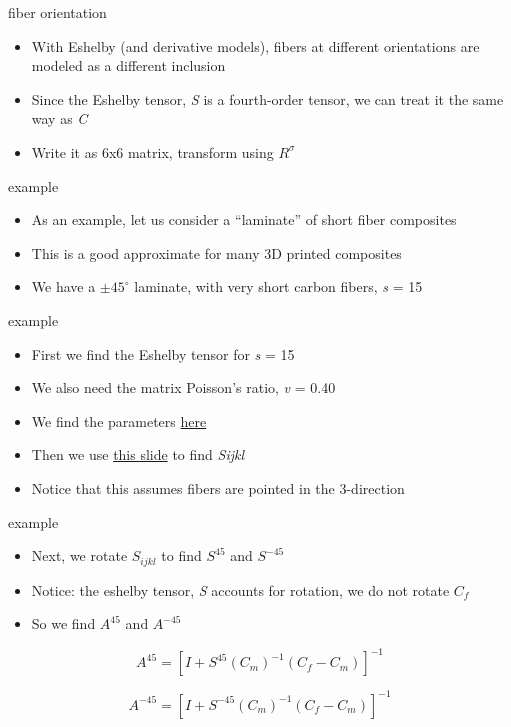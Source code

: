 \documentclass[
  letterpaper,
  ignorenonframetext,
  aspectratio=43,
  handout,
  12pt]{beamer}
\providecommand{\tightlist}{%
  \setlength{\itemsep}{0pt}\setlength{\parskip}{0pt}}
\providecommand{\tightlist}{%
\setlength{\itemsep}{0pt}\setlength{\parskip}{0pt}}
\begin{document}
\begin{frame}{fiber orientation}
\protect\hypertarget{fiber-orientation}{}
\begin{itemize}
\tightlist
\item
  With Eshelby (and derivative models), fibers at different orientations
  are modeled as a different inclusion
\item
  Since the Eshelby tensor, \emph{S} is a fourth-order tensor, we can
  treat it the same way as \emph{C}
\item
  Write it as 6x6 matrix, transform using \(R^\sigma\)
\end{itemize}
\end{frame}

\begin{frame}{example}
\protect\hypertarget{example}{}
\begin{itemize}
\tightlist
\item
  As an example, let us consider a ``laminate'' of short fiber
  composites
\item
  This is a good approximate for many 3D printed composites
\item
  We have a \(\pm 45^\circ\) laminate, with very short carbon fibers,
  \emph{s} = 15
\end{itemize}
\end{frame}

\begin{frame}{example}
\protect\hypertarget{example-1}{}
\begin{itemize}
\tightlist
\item
  First we find the Eshelby tensor for \emph{s} = 15
\item
  We also need the matrix Poisson's ratio, \emph{v} = 0.40
\item
  We find the parameters \protect\hyperlink{ux2feshelby-params}{here}
\item
  Then we use \protect\hyperlink{ux2feshelby-table}{this slide} to find
  \emph{S}\emph{ijkl}
\item
  Notice that this assumes fibers are pointed in the 3-direction
\end{itemize}
\end{frame}

\begin{frame}{example}
\protect\hypertarget{example-2}{}
\begin{itemize}
\tightlist
\item
  Next, we rotate \(S_{ijkl}\) to find \(S^{45}\) and \(S^{-45}\)
\item
  Notice: the eshelby tensor, \emph{S} accounts for rotation, we do not
  rotate \(C_f\)
\item
  So we find \(A^{45}\) and \(A^{-45}\)
\end{itemize}

\[A^{45} = \left[I + S^{45} (C_m)^{-1}(C_f-C_m) \right]^{-1}\]

\[A^{-45} = \left[I + S^{-45} (C_m)^{-1}(C_f-C_m) \right]^{-1}\]
\end{frame}
\end{document}
